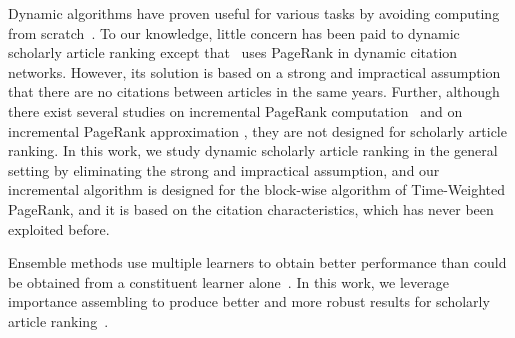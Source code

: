 Dynamic algorithms have proven useful for various tasks by avoiding computing from scratch~\cite{RamalingamR93}.
To our knowledge, little concern has been paid to dynamic scholarly article ranking except that~\cite{GhoshKHLL11} uses PageRank in dynamic citation networks. However, its solution is based on a strong and impractical assumption that there are no citations between articles in the same years.
Further, although there exist several studies on incremental PageRank computation~\cite{DesikanPSK05,AbiteboulPC03,WuR09} and on incremental PageRank approximation \cite{BahmaniCG10,BahmaniKMU12}, they are not designed for scholarly article ranking.
%
In this work, we study dynamic scholarly article ranking in the general setting by eliminating the strong and impractical assumption, and our incremental algorithm
is designed for the block-wise algorithm of Time-Weighted PageRank, and it is based on the citation characteristics, which has never been exploited before.


Ensemble methods use multiple learners to obtain better performance than could be obtained from a constituent learner alone~\cite{zhihua-book}.
In this work, we leverage  importance assembling  to produce better and more robust results for scholarly article ranking~\cite{zhihua-book,wsdmcup,DuanAMHH16}.
